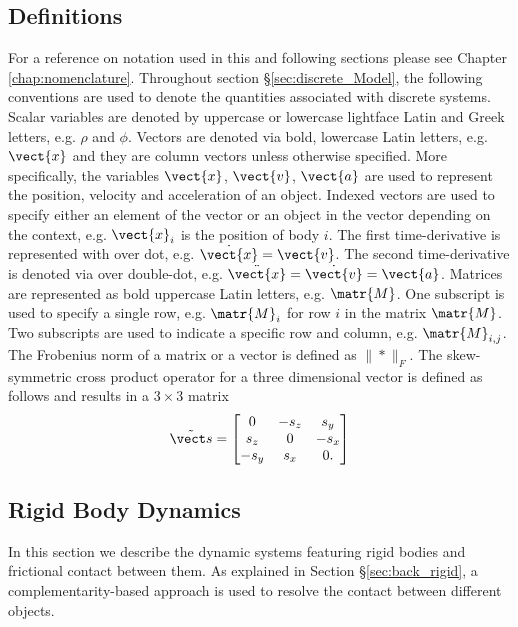 \subsection{Definitions}
For a reference on notation used in this and following sections please see Chapter \ref{chap:nomenclature}.
Throughout section \S\ref{sec:discrete_Model}, the following conventions are used to denote the quantities associated with discrete systems. Scalar variables are denoted by uppercase or lowercase lightface Latin and Greek letters, e.g. $\rho$ and $\phi$. Vectors are denoted via bold, lowercase Latin letters, e.g. $\vect{x}$ and they are column vectors unless otherwise specified. More specifically, the variables $\vect{x}$, $\vect{v}$, $\vect{a}$ are used to represent the position, velocity and acceleration of an object. Indexed vectors are used to specify either an element of the vector or an object in the vector depending on the context, e.g. $\vect{x}_i$ is the position of body $i$. The first time-derivative is represented with over dot, e.g. $\dot{\vect{x}} = \vect{v}$.  The second time-derivative is denoted via over double-dot, e.g. $\ddot{\vect{x}} = \dot{\vect{v}} = \vect{a}$.  Matrices are represented as bold uppercase Latin letters, e.g. $\matr{M}$. One subscript is used to specify a single row, e.g. $\matr{M}_i$ for row $i$ in the matrix $\matr{M}$. Two subscripts are used to indicate a specific row and column, e.g. $\matr{M}_{i,j}$.   
The Frobenius norm of a matrix or a vector is defined as $\|*\|_F$. The skew-symmetric cross product operator for a three dimensional vector is defined as follows and results in a $3\times 3$ matrix
\begin{equation}
\tilde{{\vect s}} = \begin{bmatrix}
0 & -{s}_z & {s}_y\\ 
{s}_z & 0 & -{s}_x\\ 
-{s}_y & {s}_x & 0.
\end{bmatrix}
\end{equation}
\subsection{Rigid Body Dynamics}\label{sec:RigidBody}
In this section we describe the dynamic systems featuring rigid bodies and frictional contact between them. As explained in Section \S\ref{sec:back_rigid}, a complementarity-based approach is used to resolve the contact between different objects. 


